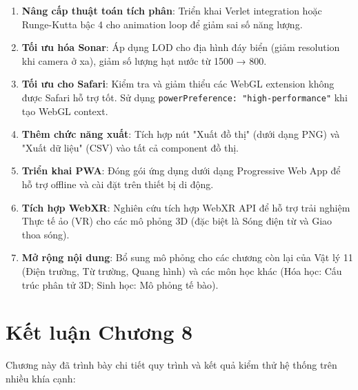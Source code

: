 \begin{enumerate}
    \item \textbf{Nâng cấp thuật toán tích phân}: Triển khai Verlet integration hoặc Runge-Kutta bậc 4 cho animation loop để giảm sai số năng lượng.
    
    \item \textbf{Tối ưu hóa Sonar}: Áp dụng LOD cho địa hình đáy biển (giảm resolution khi camera ở xa), giảm số lượng hạt nước từ 1500 → 800.
    
    \item \textbf{Tối ưu cho Safari}: Kiểm tra và giảm thiểu các WebGL extension không được Safari hỗ trợ tốt. Sử dụng \texttt{powerPreference: "high-performance"} khi tạo WebGL context.
    
    \item \textbf{Thêm chức năng xuất}: Tích hợp nút "Xuất đồ thị" (dưới dạng PNG) và "Xuất dữ liệu" (CSV) vào tất cả component đồ thị.
    
    \item \textbf{Triển khai PWA}: Đóng gói ứng dụng dưới dạng Progressive Web App để hỗ trợ offline và cài đặt trên thiết bị di động.
    
    \item \textbf{Tích hợp WebXR}: Nghiên cứu tích hợp WebXR API để hỗ trợ trải nghiệm Thực tế ảo (VR) cho các mô phỏng 3D (đặc biệt là Sóng điện từ và Giao thoa sóng).
    
    \item \textbf{Mở rộng nội dung}: Bổ sung mô phỏng cho các chương còn lại của Vật lý 11 (Điện trường, Từ trường, Quang hình) và các môn học khác (Hóa học: Cấu trúc phân tử 3D; Sinh học: Mô phỏng tế bào).
\end{enumerate}

\section{Kết luận Chương 8}

Chương này đã trình bày chi tiết quy trình và kết quả kiểm thử hệ thống trên nhiều khía cạnh:


